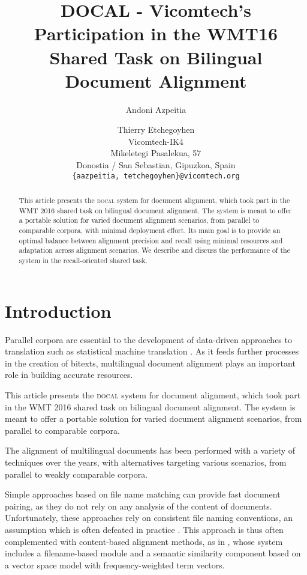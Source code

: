 \documentclass[11pt]{article}
\title{DOCAL - Vicomtech's Participation in the WMT16 Shared Task on Bilingual Document Alignment}
\author{Andoni Azpeitia \and Thierry Etchegoyhen\\
	    Vicomtech-IK4\\
	    Mikeletegi Pasalekua, 57\\
	    Donostia / San Sebastian, Gipuzkoa, Spain\\
	    {\tt \{aazpeitia, tetchegoyhen\}@vicomtech.org}}
\date{}
\begin{document}
\maketitle

\begin{abstract}

This article presents the \textsc{docal} system for document alignment, which took part in the WMT 2016 shared task on bilingual document alignment. The system is meant to offer a portable solution for varied document alignment scenarios, from parallel to comparable corpora, with minimal deployment effort. Its main goal is to provide an optimal balance between alignment precision and recall using minimal resources and adaptation across alignment scenarios. We describe and discuss the performance of the system in the recall-oriented shared task.

\end{abstract}

\section{Introduction}

Parallel corpora are essential to the development of data-driven approaches to translation such as statistical machine translation \cite{brown1990smt}. As it feeds further processes in the creation of bitexts, multilingual document alignment plays an important role in building accurate resources. 

This article presents the \textsc{docal} system for document alignment, which took part in the WMT 2016 shared task on bilingual document alignment. The system is meant to offer a portable solution for varied document alignment scenarios, from parallel to comparable corpora.

The alignment of multilingual documents has been performed with a variety of techniques over the years, with alternatives targeting various scenarios, from parallel to weakly comparable corpora. 

Simple approaches based on file name matching can provide fast document pairing, as they do not rely on any analysis of the content of documents. Unfortunately, these approaches rely on consistent file naming conventions, an assumption which is often defeated in practice  \cite{Tiedemann2011bitext}. This approach is thus often complemented with content-based alignment methods, as in \cite{chen2004discovering}, whose system includes a filename-based module and a semantic similarity component based on a vector space model with frequency-weighted term vectors.
\end{document}
